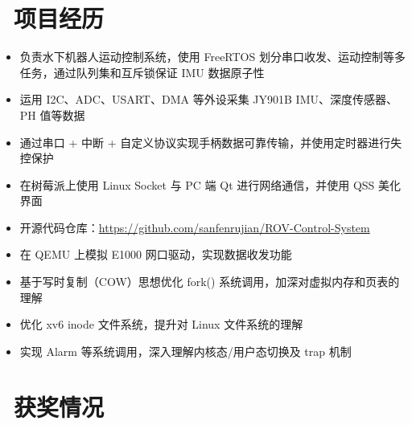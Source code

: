 \documentclass{resume}
\begin{document}
\section{\faHeartO\ 项目经历}
\begin{itemize}
  \item 负责水下机器人运动控制系统，使用 FreeRTOS 划分串口收发、运动控制等多任务，通过队列集和互斥锁保证 IMU 数据原子性
  \item 运用 I2C、ADC、USART、DMA 等外设采集 JY901B IMU、深度传感器、PH 值等数据
  \item 通过串口 + 中断 + 自定义协议实现手柄数据可靠传输，并使用定时器进行失控保护
  \item 在树莓派上使用 Linux Socket 与 PC 端 Qt 进行网络通信，并使用 QSS 美化界面
  \item 开源代码仓库：\url{https://github.com/sanfenrujian/ROV-Control-System}
\end{itemize}

\begin{itemize}
  \item 在 QEMU 上模拟 E1000 网口驱动，实现数据收发功能
  \item 基于写时复制（COW）思想优化 fork() 系统调用，加深对虚拟内存和页表的理解
  \item 优化 xv6 inode 文件系统，提升对 Linux 文件系统的理解
  \item 实现 Alarm 等系统调用，深入理解内核态/用户态切换及 trap 机制
\end{itemize}

\section{\faHeartO\ 获奖情况}
\end{document}
